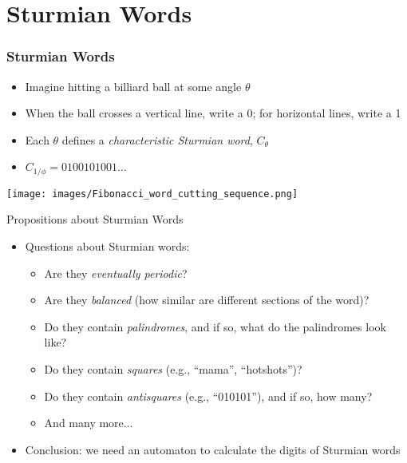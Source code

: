 \documentclass[leqno,presentation]{beamer}
\begin{document}
\section{Sturmian Words}


\begin{frame}
    \frametitle{Sturmian Words}
    
    \begin{itemize}
        \item Imagine hitting a billiard ball at some angle $\theta$
        \item When the ball crosses a vertical line, write a 0; for horizontal lines, write a 1
        \item Each $\theta$ defines a \emph{characteristic Sturmian word}, $C_{\theta}$
        \item $C_{1/\phi} = 0100101001\ldots$
    \end{itemize}
    \texttt{[image: images/Fibonacci\_word\_cutting\_sequence.png]}
\end{frame}

\begin{frame}{Propositions about Sturmian Words}
    \begin{itemize}
        \item Questions about Sturmian words:
            \begin{itemize}
                \item Are they \emph{eventually periodic}?
                \item Are they \emph{balanced} (how similar are different sections of the word)?
                \item Do they contain \emph{palindromes}, and if so, what do the palindromes look like?
                \item Do they contain \emph{squares} (e.g., ``mama'', ``hotshots'')?
                \item Do they contain \emph{antisquares} (e.g., ``010101''), and if so, how many?
                \item And many more...
            \end{itemize}
            
        \item Conclusion: we need an automaton to calculate the digits of Sturmian words
    \end{itemize}
\end{frame}
\end{document}
